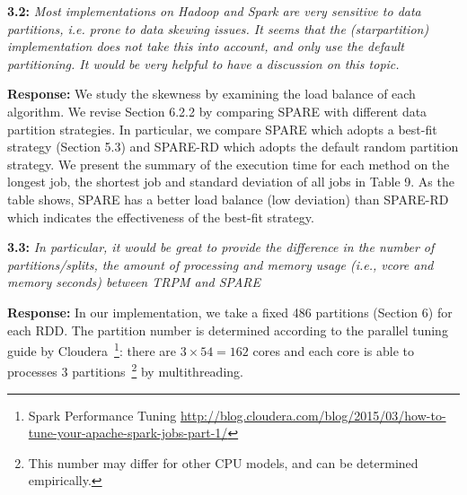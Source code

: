\textbf{3.2:} \emph{Most implementations
on Hadoop and Spark are very sensitive to data partitions, i.e. prone to data
skewing issues. It seems that the (starpartition)
implementation does not take
this into account, and only use the default partitioning. It would be very helpful
to have a discussion on this topic.}

\textbf{Response:}  We study the skewness by examining the load balance of each algorithm.
We revise Section 6.2.2 by comparing SPARE with different data partition strategies.
In particular, we compare SPARE which adopts a best-fit strategy (Section 5.3) and SPARE-RD
which adopts the default random partition strategy.
We present the summary of the execution time for each method on the longest job, the shortest job and standard
deviation of all jobs in Table 9. As the table shows, SPARE has a better load balance (low deviation)
than SPARE-RD which indicates the effectiveness of the best-fit strategy. 




\textbf{3.3:} \emph{In particular, it would be great to provide the
difference in the number of partitions/splits, the amount of processing and
memory usage (i.e., vcore and memory seconds) between TRPM and SPARE}

\textbf{Response:} In our implementation, we take a fixed 486 partitions (Section 6)
for each RDD. The partition number is determined according to
the parallel tuning guide by Cloudera~\footnote{Spark Performance Tuning \url{http://blog.cloudera.com/blog/2015/03/how-to-tune-your-apache-spark-jobs-part-1/}}: there are  $3\times 54=162$ cores and each core is able to processes 3 partitions~\footnote{This number may differ for other CPU models, and can be determined empirically.}
by multithreading.

